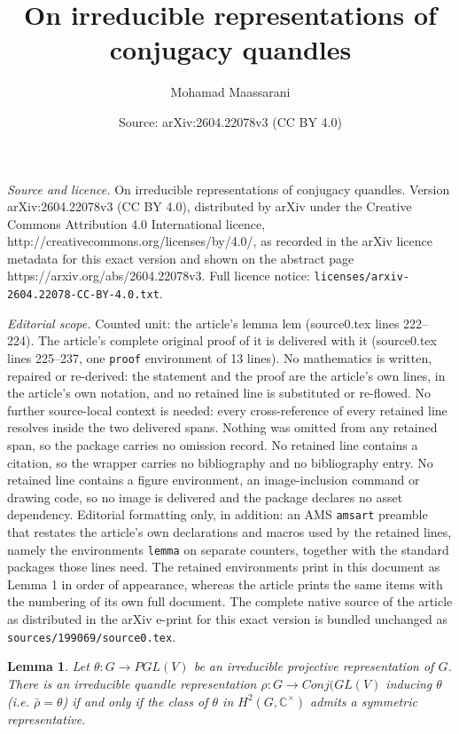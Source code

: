 \documentclass[10pt,a4paper]{amsart}
\title{On irreducible representations of conjugacy quandles}
\author{Mohamad Maassarani}
\date{Source: arXiv:2604.22078v3 (CC BY 4.0)}
\newtheorem{lemma}{Lemma}
\begin{document}
\maketitle

\noindent\emph{Source and licence.} On irreducible representations of conjugacy quandles. Version arXiv:2604.22078v3 (CC BY 4.0), distributed by arXiv under the Creative Commons Attribution 4.0 International licence, http://creativecommons.org/licenses/by/4.0/, as recorded in the arXiv licence metadata for this exact version and shown on the abstract page https://arxiv.org/abs/2604.22078v3. Full licence notice: \texttt{licenses/arxiv-2604.22078-CC-BY-4.0.txt}.\par\smallskip

\noindent\textit{Editorial scope.} Counted unit: the article's lemma lem (source0.tex lines 222--224). The article's complete original proof of it is delivered with it (source0.tex lines 225--237, one \texttt{proof} environment of 13 lines). No mathematics is written, repaired or re-derived: the statement and the proof are the article's own lines, in the article's own notation, and no retained line is substituted or re-flowed.  No further source-local context is needed: every cross-reference of every retained line resolves inside the two delivered spans.  Nothing was omitted from any retained span, so the package carries no omission record.  No retained line contains a citation, so the wrapper carries no bibliography and no bibliography entry.  No retained line contains a figure environment, an image-inclusion command or drawing code, so no image is delivered and the package declares no asset dependency.  Editorial formatting only, in addition: an AMS \texttt{amsart} preamble that restates the article's own declarations and macros used by the retained lines, namely the environments \texttt{lemma} on separate counters, together with the standard packages those lines need.  The retained environments print in this document as Lemma 1 in order of appearance, whereas the article prints the same items with the numbering of its own full document.  The complete native source of the article as distributed in the arXiv e-print for this exact version is bundled unchanged as \texttt{sources/199069/source0.tex}.
\begin{lemma}\label{lem}
Let $\theta : G \to PGL(V)$ be an irreducible projective representation of $G$. There is an irreducible quandle representation $\rho:G\to Conj(GL(V)$ inducing $\theta$ (i.e. $\bar{\rho}=\theta$) if and only if the class of $\theta$ in $H^2(G,\mathbb{C}^\times)$ admits a symmetric representative. 
\end{lemma}
\end{document}
